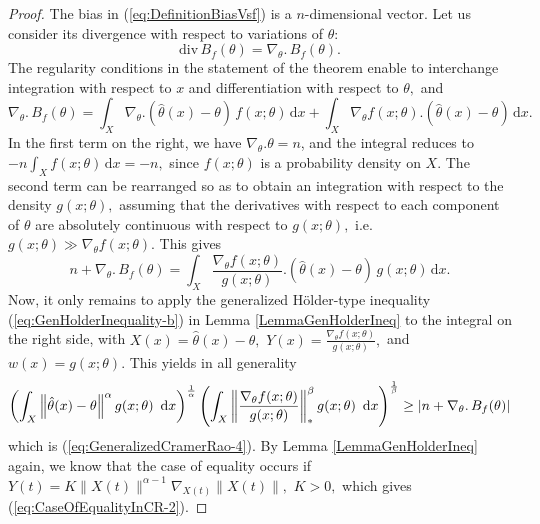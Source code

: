 \documentclass[english]{elsarticle}
\theoremstyle{definition}
\theoremstyle{plain}
\theoremstyle{plain}
\begin{document}
\begin{proof}
The bias in (\ref{eq:DefinitionBiasVsf}) is a $n$-dimensional vector.
Let us consider its divergence with respect to variations of $\theta$:
\begin{equation}
\mathrm{div}\, B_{f}(\theta)=\nabla_{\theta}.\, B_{f}(\theta).
\end{equation}
The regularity conditions in the statement of the theorem enable to
interchange integration with respect to $x$ and differentiation with
respect to $\theta,$ and 
\begin{equation}
\nabla_{\theta}.\, B_{f}(\theta)=\int_{X}\nabla_{\theta}.\left(\hat{\theta}(x)-\theta\right)\, f(x;\theta)\,\text{d}x+\int_{X}\nabla_{\theta}f(x;\theta).\left(\hat{\theta}(x)-\theta\right)\,\text{d}x.
\end{equation}
In the first term on the right, we have $\nabla_{\theta}.\theta=n$,
and the integral reduces to $-n\int_{X}f(x;\theta)\,\text{d}x=-n,$
since $f(x;\theta)$ is a probability density on $X.$ The second
term can be rearranged so as to obtain an integration with respect
to the density $g(x;\theta),$ assuming that the derivatives with
respect to each component of $\theta$ are absolutely continuous with
respect to $g(x;\theta),$ i.e. $g(x;\theta)\gg\nabla_{\theta}f(x;\theta)$.
This gives
\begin{equation}
n+\nabla_{\theta}.\, B_{f}(\theta)=\int_{X}\frac{\nabla_{\theta}f(x;\theta)}{g(x;\theta)}.\left(\hat{\theta}(x)-\theta\right)\, g(x;\theta)\,\text{d}x.
\end{equation}
Now, it only remains to apply the generalized Hölder-type inequality
(\ref{eq:GenHolderInequality-b}) in Lemma \ref{LemmaGenHolderIneq}
to the integral on the right side, with $X(x)=\hat{\theta}(x)-\theta,$
$Y(x)=\frac{\nabla_{\theta}f(x;\theta)}{g(x;\theta)},$ and $w(x)=g(x;\theta).$
This yields in all generality 
\begin{equation}
\left(\int_{X}\left\Vert \hat{\theta}(x)-\theta\right\Vert ^{\alpha}g(x;\theta)\text{\,\ d}x\right)^{\frac{1}{\alpha}}\left(\int_{X}\left\Vert \frac{\nabla_{\theta}f(x;\theta)}{g(x;\theta)}\right\Vert _{*}^{\beta}g(x;\theta)\text{\,\ d}x\right)^{\frac{1}{\beta}}\geq\left|n+\nabla_{\theta}.\, B_{f}(\theta)\right|
\end{equation}
which is (\ref{eq:GeneralizedCramerRao-4}). By Lemma \ref{LemmaGenHolderIneq}
again, we know that the case of equality occurs if $Y(t)=K\|X(t)\|^{\alpha-1}\nabla_{X(t)}\|X(t)\|,$
$K>0,$ which gives (\ref{eq:CaseOfEqualityInCR-2}).
\end{proof}
\end{document}
